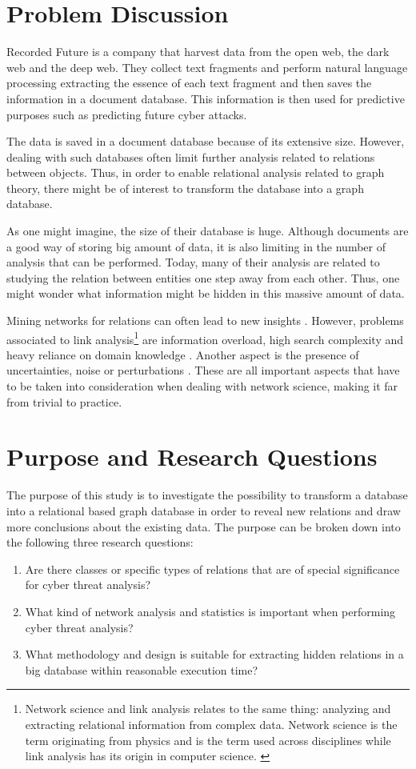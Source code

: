 \section{Problem Discussion}
Recorded Future is a company that harvest data from the open web, the dark web and the deep web. They collect text fragments and perform natural language processing extracting the essence of each text fragment and then saves the information in a document database. This information is then used for predictive purposes such as predicting future cyber attacks.

The data is saved in a document database because of its extensive size. However, dealing with such databases often limit further analysis related to relations between objects. Thus, in order to enable relational analysis related to graph theory, there might be of interest to transform the database into a graph database.

As one might imagine, the size of their database is huge. Although documents are a good way of storing big amount of data, it is also limiting in the number of analysis that can be performed. Today, many of their analysis are related to studying the relation between entities one step away from each other. Thus, one might wonder what information might be hidden in this massive amount of data.

Mining networks for relations can often lead to new insights \cite{hendrix2010}. However, problems associated to link analysis\footnote{Network science and link analysis relates to the same thing: analyzing and extracting relational information from complex data. Network science is the term originating from physics and is the term used across disciplines while link analysis has its origin in computer science. \cite{fouss2016algorithms}} are information overload, high search complexity and heavy reliance on domain knowledge \cite{hendrix2010,schroeder2007}. Another aspect is the presence of uncertainties, noise or perturbations \cite{hendrix2010}. These are all important aspects that have to be taken into consideration when dealing with network science, making it far from trivial to practice. 

\section{Purpose and Research Questions}
The purpose of this study is to investigate the possibility to transform a database into a relational based graph database in order to reveal new relations and draw more conclusions about the existing data. The purpose can be broken down into the following three research questions:
\begin{enumerate}
	\item Are there classes or specific types of relations that are of special significance for cyber threat analysis?
    \item What kind of network analysis and statistics is important when performing cyber threat analysis?
    \item What methodology and design is suitable for extracting hidden relations in a big database within reasonable execution time?
\end{enumerate}

